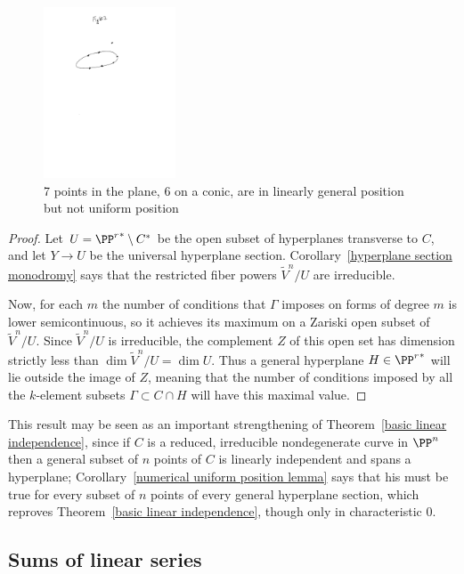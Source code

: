 \begin{figure}
\begin{center}
\centerline {\includegraphics[height=2in]{"Fig10.2.pdf"}}
\caption{7 points in the plane, 6 on a conic, are in linearly general position but not uniform position}
\label{default}
\end{center}
\end{figure}

\begin{proof} Let $U = {\PP^r}^* \setminus C^*$ be the open subset of hyperplanes transverse to $C$, and let $Y\to U$ be the universal hyperplane section.
Corollary~\ref{hyperplane section monodromy} says that the restricted fiber powers $\tilde V^n/U$ are irreducible.

Now, for each $m$ the number of conditions that $\Gamma$ imposes on forms of degree $m$ is lower semicontinuous, so it achieves its maximum on a Zariski open subset of $\tilde V^n/U$. Since $\tilde V^n/U$ is irreducible, the complement $Z$ of this open set has dimension strictly less than $\dim \tilde V^n/U = \dim U$. Thus a general hyperplane $H \in {\PP^r}^*$ will lie outside the image of $Z$, meaning that the number of conditions imposed by all the $k$-element subsets $\Gamma \subset C \cap H$ will have this maximal value.
\end{proof}

This result may be seen as an important strengthening of Theorem~\ref{basic linear independence}, since if $C$ is a reduced, irreducible nondegenerate curve in $\PP^n$ then a general subset of $n$ points of $C$ is linearly independent and spans a hyperplane; Corollary~\ref{numerical uniform position lemma} says that his must
be true for every subset of $n$ points of every general hyperplane section, 
which reproves Theorem~\ref{basic linear independence}, though only in characteristic 0. 

\subsection{Sums of linear series}

